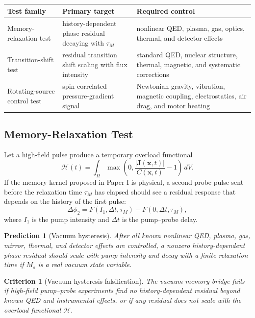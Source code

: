 \documentclass[11pt]{article}
\newtheorem{prediction}{Prediction}
\newtheorem{criterion}{Criterion}
\begin{document}
\begin{center}
\small
\begin{tabular}{L{0.25\textwidth}L{0.31\textwidth}L{0.30\textwidth}}
\toprule
\textbf{Test family} & \textbf{Primary target} & \textbf{Required control}\\
\midrule
Memory-relaxation test & history-dependent phase residual decaying with $\tau_M$ & nonlinear QED, plasma, gas, optics, thermal, and detector effects\\
Transition-shift test & residual transition shift scaling with flux intensity & standard QED, nuclear structure, thermal, magnetic, and systematic corrections\\
Rotating-source control test & spin-correlated pressure-gradient signal & Newtonian gravity, vibration, magnetic coupling, electrostatics, air drag, and motor heating\\
\bottomrule
\end{tabular}
\end{center}

\subsection{Memory-Relaxation Test}

Let a high-field pulse produce a temporary overload functional
\begin{equation}
    \mathcal{H}(t)
    =
    \int_{\Omega}
    \max\!\left(0,\frac{|\bm{J}(\bm{x},t)|}{C(\bm{x},t)}-1\right)\,dV.
\end{equation}
If the memory kernel proposed in Paper I is physical, a second probe pulse sent
before the relaxation time $\tau_M$ has elapsed should see a residual response
that depends on the history of the first pulse:
\begin{equation}
    \Delta\phi_2
    =
    F(I_1,\Delta t,\tau_M)-F(0,\Delta t,\tau_M),
\end{equation}
where $I_1$ is the pump intensity and $\Delta t$ is the pump--probe delay.

\begin{prediction}[Vacuum hysteresis]
After all known nonlinear QED, plasma, gas, mirror, thermal, and detector
effects are controlled, a nonzero history-dependent phase residual should scale
with pump intensity and decay with a finite relaxation time if $M_s$ is a real
vacuum state variable.
\end{prediction}

\begin{criterion}[Vacuum-hysteresis falsification]
The vacuum-memory bridge fails if high-field pump--probe experiments find no
history-dependent residual beyond known QED and instrumental effects, or if any
residual does not scale with the overload functional $\mathcal{H}$.
\end{criterion}
\end{document}
